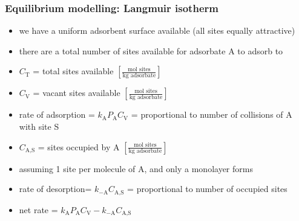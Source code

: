 \begin{frame}\frametitle{Equilibrium modelling: Langmuir isotherm}
	\begin{itemize}
		\item	we have a uniform adsorbent surface available {\tiny (all sites equally attractive)}
		\item	there are a total number of sites available for adsorbate A to adsorb to
		\item	$C_\text{T}$ = total sites available \hfill {\scriptsize $\left[\displaystyle\frac{\text{mol sites}}{\text{kg adsorbate}} \right]$}
		\pause
		\item	$C_\text{V}$ = vacant sites available \hfill {\scriptsize $\left[\displaystyle\frac{\text{mol sites}}{\text{kg adsorbate}} \right]$}
		\item	rate of adsorption = $k_\text{A} P_\text{A} C_\text{V}$ = proportional to number of collisions of A with site S
		\pause
		\item	$C_\text{A,S}$ = sites occupied by A \hfill {\scriptsize $\left[\displaystyle\frac{\text{mol sites}}{\text{kg adsorbate}} \right]$}
		\item	assuming 1 site per molecule of A, and only a monolayer forms
		\item	rate of desorption=  $k_{-\text{A}} C_\text{A,S}$ = proportional to number of occupied sites
		\item	net rate = $k_\text{A} P_\text{A} C_\text{V} - k_{-\text{A}} C_\text{A,S}$  
	\end{itemize}
\end{frame}

